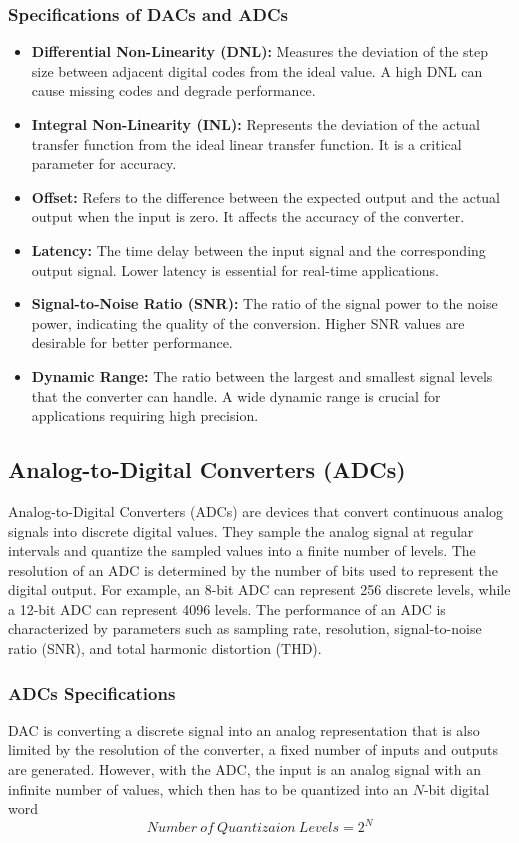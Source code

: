 \subsubsection{Specifications of DACs and ADCs}
\begin{itemize}
    \item \textbf{Differential Non-Linearity (DNL):} Measures the deviation of the step size between adjacent digital codes from the ideal value. A high DNL can cause missing codes and degrade performance.
    \item \textbf{Integral Non-Linearity (INL):} Represents the deviation of the actual transfer function from the ideal linear transfer function. It is a critical parameter for accuracy.
    \item \textbf{Offset:} Refers to the difference between the expected output and the actual output when the input is zero. It affects the accuracy of the converter.
    \item \textbf{Latency:} The time delay between the input signal and the corresponding output signal. Lower latency is essential for real-time applications.
    \item \textbf{Signal-to-Noise Ratio (SNR):} The ratio of the signal power to the noise power, indicating the quality of the conversion. Higher SNR values are desirable for better performance.
    \item \textbf{Dynamic Range:} The ratio between the largest and smallest signal levels that the converter can handle. A wide dynamic range is crucial for applications requiring high precision.
\end{itemize}
\subsection{Analog-to-Digital Converters (ADCs)}
Analog-to-Digital Converters (ADCs) are devices that convert continuous analog signals into discrete digital values. They sample the analog signal at regular intervals and quantize the sampled values into a finite number of levels. The resolution of an ADC is determined by the number of bits used to represent the digital output. For example, an 8-bit ADC can represent 256 discrete levels, while a 12-bit ADC can represent 4096 levels. The performance of an ADC is characterized by parameters such as sampling rate, resolution, signal-to-noise ratio (SNR), and total harmonic distortion (THD).
\subsubsection{ADCs Specifications}
DAC is converting a discrete
signal into an analog representation that is also limited by the resolution of the converter,
a fixed number of inputs and outputs are generated. However, with the ADC, the input is
an analog signal with an infinite number of values, which then has to be quantized into an
\(N\)-bit digital word
\begin{equation}
    Number\ of\ Quantizaion\ Levels = 2^N
\end{equation}

